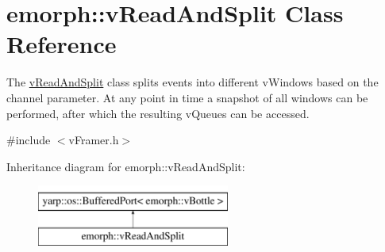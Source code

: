 \hypertarget{classemorph_1_1vReadAndSplit}{\section{emorph\-:\-:v\-Read\-And\-Split Class Reference}
\label{classemorph_1_1vReadAndSplit}
}


The \hyperlink{classemorph_1_1vReadAndSplit}{v\-Read\-And\-Split} class splits events into different v\-Windows based on the channel parameter. At any point in time a snapshot of all windows can be performed, after which the resulting v\-Queues can be accessed.  




{\ttfamily \#include $<$v\-Framer.\-h$>$}

Inheritance diagram for emorph\-:\-:v\-Read\-And\-Split\-:\begin{figure}[H]
\begin{center}
\leavevmode
\includegraphics[height=2.000000cm]{classemorph_1_1vReadAndSplit}
\end{center}
\end{figure}
